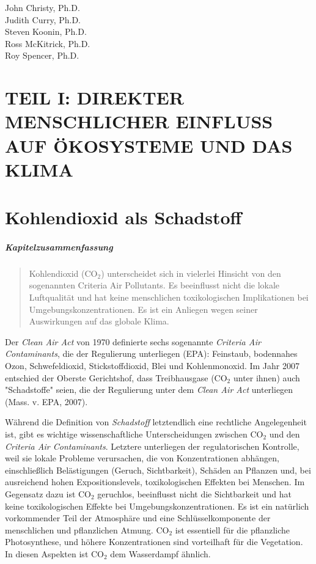 \documentclass[12pt,paper=a4,DIV=12,parskip=never,chapterprefix=false,headings=standardclasses]{scrreprt}
\begin{document}
\noindent
John Christy, Ph.D.\\[1em]
Judith Curry, Ph.D.\\[1em]
Steven Koonin, Ph.D.\\[1em]
Ross McKitrick, Ph.D.\\[1em]
Roy Spencer, Ph.D.

\cleardoublepage
\chapter*{TEIL I: DIREKTER MENSCHLICHER EINFLUSS AUF ÖKOSYSTEME UND DAS KLIMA}
\cleardoublepage
{}
\chapter{Kohlendioxid als Schadstoff}
\paragraph{Kapitelzusammenfassung}
\begin{quote}
Kohlendioxid (CO$_2$) unterscheidet sich in vielerlei Hinsicht von den sogenannten Criteria Air Pollutants. Es beeinflusst nicht die lokale Luftqualität und hat keine menschlichen toxikologischen Implikationen bei Umgebungskonzentrationen. Es ist ein Anliegen wegen seiner Auswirkungen auf das globale Klima.
\end{quote}

Der \emph{Clean Air Act} von 1970 definierte sechs sogenannte \emph{Criteria Air Contaminants}, die der Regulierung unterliegen (EPA): Feinstaub, bodennahes Ozon, Schwefeldioxid, Stickstoffdioxid, Blei und Kohlenmonoxid. Im Jahr 2007 entschied der Oberste Gerichtshof, dass Treibhausgase (CO$_2$ unter ihnen) auch "Schadstoffe" seien, die der Regulierung unter dem \emph{Clean Air Act} unterliegen (Mass. v. EPA, 2007).

Während die Definition von \emph{Schadstoff} letztendlich eine rechtliche Angelegenheit ist, gibt es wichtige wissenschaftliche Unterscheidungen zwischen CO$_2$ und den \emph{Criteria Air Contaminants}. Letztere unterliegen der regulatorischen Kontrolle, weil sie lokale Probleme verursachen, die von Konzentrationen abhängen, einschließlich Belästigungen (Geruch, Sichtbarkeit), Schäden an Pflanzen und, bei ausreichend hohen Expositionslevels, toxikologischen Effekten bei Menschen. Im Gegensatz dazu ist CO$_2$ geruchlos, beeinflusst nicht die Sichtbarkeit und hat keine toxikologischen Effekte bei Umgebungskonzentrationen. Es ist ein natürlich vorkommender Teil der Atmosphäre und eine Schlüsselkomponente der menschlichen und pflanzlichen Atmung. CO$_2$ ist essentiell für die pflanzliche Photosynthese, und höhere Konzentrationen sind vorteilhaft für die Vegetation. In diesen Aspekten ist CO$_2$ dem Wasserdampf ähnlich.
\end{document}
